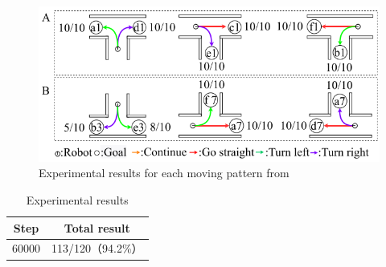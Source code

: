 
\begin{figure}[hbtp]
  \centering
 \includegraphics[keepaspectratio, scale=0.5]
      {images/60000step.png}
 \caption{Experimental results for each moving pattern from \cite{mech}}
 \label{Fig:60000step}
\end{figure}



\begin{table}[hbtp]
  \caption{Experimental results}
  \label{table:result}
  \centering
  \begin{tabular}{|c|c|}
    \hline
    Step & Total result\\
    \hline
    60000 & 113/120（94.2\%）\\
    \hline
  \end{tabular}
\end{table}


